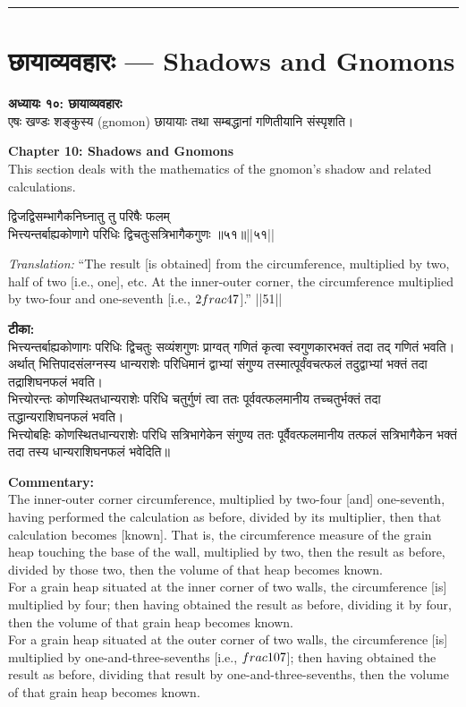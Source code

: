 \documentclass[10pt,a4paper]{article}
\newcommand{\dev}[1]{{\devanagarifont #1}}
\newcommand{\longline}{\noindent\rule{\textwidth}{0.4pt}}
\newcommand{\vnum}[1]{\hfill\textnormal{||#1||}}
\newenvironment{shloka}{%
  \begin{lrbox}{\shlokabox}
  \begin{minipage}{\dimexpr\textwidth-16pt\relax}%
  \devanagarifont\centering\setstretch{1.3}%
}{%
  \end{minipage}%
  \end{lrbox}%
  \par\medskip\noindent\fcolorbox{rulecolor}{versebg}{\usebox{\shlokabox}}\par\medskip
}
\newcommand{\bilingual}[2]{%
  \noindent%
  \begin{minipage}[t]{0.47\textwidth}%
    \setstretch{1.15}#1%
  \end{minipage}%
  \hfill%
  \vrule\hfill%
  \begin{minipage}[t]{0.47\textwidth}%
    \setstretch{1.15}#2%
  \end{minipage}%
  \par\medskip
}
\begin{document}
\vspace{0.5em}
\noindent\longline
\vspace{0.5em}

\section{\dev{छायाव्यवहारः} --- Shadows and Gnomons}

\bilingual{%
\textbf{अध्यायः १०: छायाव्यवहारः}\\[0.3em]
एषः खण्डः शङ्कुस्य (gnomon) छायायाः तथा सम्बद्धानां गणितीयानि संस्पृशति।
}{%
\textbf{Chapter 10: Shadows and Gnomons}\\[0.3em]
This section deals with the mathematics of the gnomon's shadow and related calculations.
}

\bilingual{%
\begin{shloka}
द्विजद्विसम्भागैकनिघ्नातु तु परिषैः फलम्\\
भित्त्यन्तर्बाह्यकोणागे परिधिः द्विचतुःसत्रिभागैकगुणः ॥५१॥\vnum{५१}
\end{shloka}
}{%
\textit{Translation:} ``The result [is obtained] from the circumference, multiplied by two, half of two [i.e., one], etc. At the inner-outer corner, the circumference multiplied by two-four and one-seventh [i.e., $2\\frac{4}{7}$].'' ||51||
}

\bilingual{%
\textbf{टीका:}\\[0.3em]
भित्त्यन्तर्बाह्यकोणागः परिधिः द्विचतुः सव्यंशगुणः प्राग्वत्‌ गणितं कृत्वा स्वगुणकारभक्तं तदा तद्‌ गणितं भवति। अर्थात्‌ भित्तिपादसंलग्नस्य धान्यराशेः परिधिमानं द्वाभ्यां संगुण्य तस्मात्पूर्वंवचत्फलं तदुद्वाभ्यां भक्तं तदा तद्राशिघनफलं भवति।\\[0.3em]
भित्त्योरन्तः कोणस्थितधान्यराशेः परिधि चतुर्गुणं त्वा ततः पूर्ववत्फलमानीय तच्चतुर्भक्तं तदा तद्धान्यराशिघनफलं भवति।\\[0.3em]
भित्त्योबहिः कोणस्थितधान्यराशेः परिधि सत्रिभागेकेन संगुण्य ततः पूर्वैवत्फलमानीय तत्फलं सत्रिभागैकेन भक्तं तदा तस्य धान्यराशिघनफलं भवेदिति॥
}{%
\textbf{Commentary:}\\[0.3em]
The inner-outer corner circumference, multiplied by two-four [and] one-seventh, having performed the calculation as before, divided by its multiplier, then that calculation becomes [known]. That is, the circumference measure of the grain heap touching the base of the wall, multiplied by two, then the result as before, divided by those two, then the volume of that heap becomes known.\\[0.3em]
For a grain heap situated at the inner corner of two walls, the circumference [is] multiplied by four; then having obtained the result as before, dividing it by four, then the volume of that grain heap becomes known.\\[0.3em]
For a grain heap situated at the outer corner of two walls, the circumference [is] multiplied by one-and-three-sevenths [i.e., $\\frac{10}{7}$]; then having obtained the result as before, dividing that result by one-and-three-sevenths, then the volume of that grain heap becomes known.
}
\end{document}

